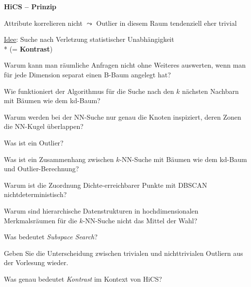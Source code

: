 \textbf{HiCS -- Prinzip}
\begin{items}
	\item Attribute korrelieren nicht \( \leadsto \) Outlier in diesem Raum tendenziell eher trivial
	\item \underline{Idee}: Suche nach Verletzung statistischer Unabhängigkeit \\* (= \textbf{Kontrast})
\end{items}

\begin{fragen}
	\begin{enumeration}
		\item Warum kann man räumliche Anfragen nicht ohne Weiteres auswerten, wenn man für jede Dimension separat einen B-Baum angelegt hat?
		\item Wie funktioniert der Algorithmus für die Suche nach den \( k \) nächsten Nachbarn mit Bäumen wie dem kd-Baum?
		\item Warum werden bei der NN-Suche nur genau die Knoten inspiziert, deren Zonen die NN-Kugel überlappen?
		\item Was ist ein Outlier?
		\item Was ist ein Zusammenhang zwischen \( k \)-NN-Suche mit Bäumen wie dem kd-Baum und Outlier-Berechnung?
		\item Warum ist die Zuordnung Dichte-erreichbarer Punkte mit DBSCAN nichtdeterministisch?
		\item Warum sind hierarchische Datenstrukturen in hochdimensionalen Merkmalsräumen für die \( k \)-NN-Suche nicht das Mittel der Wahl?
		\item Was bedeutet \emph{Subspace Search}?
		\item Geben Sie die Unterscheidung zwischen trivialen und nichttrivialen Outliern aus der Vorlesung wieder.
		\item Was genau bedeutet \emph{Kontrast} im Kontext von HiCS?
	\end{enumeration}
\end{fragen}